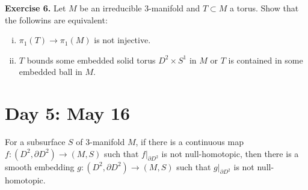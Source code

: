 \documentclass{../../../small}
\begin{document}
\textbf{Exercise 6.} Let $M$ be an irreducible 3-manifold and $T\subset M$ a torus.
Show that the followins are equivalent:
\begin{enumerate}[(i)]
\item $\pi_1(T)\to\pi_1(M)$ is not injective.
\item $T$ bounds some embedded solid torus $D^2\times S^1$ in $M$ or $T$ is contained in some embedded ball in $M$.
\end{enumerate}

\newpage
\section{Day 5: May 16}
\setcounter{section}{4}
\begin{thm}
For a subsurface $S$ of 3-manifold $M$, if there is a continuous map $f:(D^2,\partial D^2)\to(M,S)$ such that $f|_{\partial D^2}$ is not null-homotopic, then there is a smooth embedding $g:(D^2,\partial D^2)\to(M,S)$ such that $g|_{\partial D^2}$ is not null-homotopic.
\end{thm}
\end{document}
